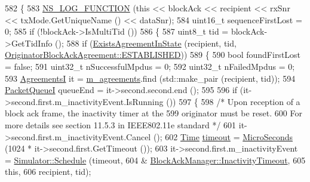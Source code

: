 \begin{DoxyCode}
582 \{
583   \hyperlink{log-macros-disabled_8h_a90b90d5bad1f39cb1b64923ea94c0761}{NS\_LOG\_FUNCTION} (\textcolor{keyword}{this} << blockAck << recipient << rxSnr << txMode.GetUniqueName () << 
      dataSnr);
584   uint16\_t sequenceFirstLost = 0;
585   \textcolor{keywordflow}{if} (!blockAck->IsMultiTid ())
586     \{
587       uint8\_t tid = blockAck->GetTidInfo ();
588       \textcolor{keywordflow}{if} (\hyperlink{classns3_1_1BlockAckManager_ae13c4678f75ebfda7f63d0521878662b}{ExistsAgreementInState} (recipient, tid, 
      \hyperlink{classns3_1_1OriginatorBlockAckAgreement_ab33ae8af8c458aca7437a472778e4761a341f78e1e094b88dea42e94b32871067}{OriginatorBlockAckAgreement::ESTABLISHED}))
589         \{
590           \textcolor{keywordtype}{bool} foundFirstLost = \textcolor{keyword}{false};
591           uint32\_t nSuccessfulMpdus = 0;
592           uint32\_t nFailedMpdus = 0;
593           \hyperlink{classns3_1_1BlockAckManager_acbd1cf7c5f3487150955c3a4c9d04102}{AgreementsI} it = \hyperlink{classns3_1_1BlockAckManager_a952a6b8b29705c83ba6464f7cf7ffe66}{m\_agreements}.find (std::make\_pair (recipient, tid));
594           \hyperlink{classns3_1_1BlockAckManager_a2bb94802381e70535e8a7c892fd01d48}{PacketQueueI} queueEnd = it->second.second.end ();
595 
596           \textcolor{keywordflow}{if} (it->second.first.m\_inactivityEvent.IsRunning ())
597             \{
598               \textcolor{comment}{/* Upon reception of a block ack frame, the inactivity timer at the}
599 \textcolor{comment}{                 originator must be reset.}
600 \textcolor{comment}{                 For more details see section 11.5.3 in IEEE802.11e standard */}
601               it->second.first.m\_inactivityEvent.Cancel ();
602               \hyperlink{namespacens3_1_1TracedValueCallback_a7ffd3e7c142ffe7c8a1d2db9b8de38ec}{Time} \hyperlink{openflow-switch_8cc_a386d174ae121d1cfa279074b7e209714}{timeout} = \hyperlink{group__timecivil_ga17465a639c8d1464e76538afdd78a9f0}{MicroSeconds} (1024 * it->second.first.GetTimeout ());
603               it->second.first.m\_inactivityEvent = \hyperlink{classns3_1_1Simulator_a671882c894a08af4a5e91181bf1eec13}{Simulator::Schedule} (timeout,
604                                                                         &
      \hyperlink{classns3_1_1BlockAckManager_a7846b31a39f8e2c3302020e4c66ae31f}{BlockAckManager::InactivityTimeout},
605                                                                         \textcolor{keyword}{this},
606                                                                         recipient, tid);

\end{DoxyCode}
